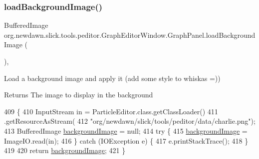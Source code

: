 \subsubsection{\texorpdfstring{load\+Background\+Image()}{loadBackgroundImage()}}
{\footnotesize\ttfamily Buffered\+Image org.\+newdawn.\+slick.\+tools.\+peditor.\+Graph\+Editor\+Window.\+Graph\+Panel.\+load\+Background\+Image (\begin{DoxyParamCaption}{ }\end{DoxyParamCaption})\hspace{0.3cm}{\ttfamily [inline]}, {\ttfamily [private]}}

Load a background image and apply it (add some style to whiskas =))

\begin{DoxyReturn}{Returns}
The image to display in the background 
\end{DoxyReturn}

\begin{DoxyCode}
409                                                     \{
410             InputStream in = ParticleEditor.class.getClassLoader()
411                     .getResourceAsStream(
412                             \textcolor{stringliteral}{"org/newdawn/slick/tools/peditor/data/charlie.png"});
413             BufferedImage \mbox{\hyperlink{classorg_1_1newdawn_1_1slick_1_1tools_1_1peditor_1_1_graph_editor_window_1_1_graph_panel_a281be1220a55ccb509f7c25f34bf6740}{backgroundImage}} = null;
414             \textcolor{keywordflow}{try} \{
415                 \mbox{\hyperlink{classorg_1_1newdawn_1_1slick_1_1tools_1_1peditor_1_1_graph_editor_window_1_1_graph_panel_a281be1220a55ccb509f7c25f34bf6740}{backgroundImage}} = ImageIO.read(in);
416             \} \textcolor{keywordflow}{catch} (IOException e) \{
417                 e.printStackTrace();
418             \}
419 
420             \textcolor{keywordflow}{return} \mbox{\hyperlink{classorg_1_1newdawn_1_1slick_1_1tools_1_1peditor_1_1_graph_editor_window_1_1_graph_panel_a281be1220a55ccb509f7c25f34bf6740}{backgroundImage}};
421         \}
\end{DoxyCode}
\mbox{\label{classorg_1_1newdawn_1_1slick_1_1tools_1_1peditor_1_1_graph_editor_window_1_1_graph_panel_a2ab79793bdbd974974d49ffa163a6e95}} 
